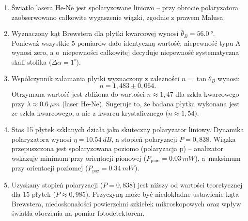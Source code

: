\documentclass[a4paper,12pt]{article}
\begin{document}
\begin{enumerate}
  \item Światło lasera He-Ne jest spolaryzowane liniowo -- przy obrocie polaryzatora
  zaobserwowano całkowite wygaszenie wiązki, zgodnie z prawem Malusa.

  \item Wyznaczony kąt Brewstera dla płytki kwarcowej wynosi $\bar{\theta}_B = \SI{56,0}{\degree}$.
  Ponieważ wszystkie 5 pomiarów dało identyczną wartość, niepewność typu A wynosi zero,
  a o~niepewności całkowitej decyduje niepewność systematyczna skali stolika ($\Delta\alpha = 1^\circ$).

  \item Współczynnik załamania płytki wyznaczony z zależności $n = \tan\theta_B$ wynosi:
  \[
  n = 1{,}483 \pm 0{,}064 .
  \]
  Otrzymana wartość jest zbliżona do wartości $n \approx 1{,}47$ dla szkła kwarcowego
  przy $\lambda \approx \SI{0,6}{\mu m}$ (laser He-Ne). Sugeruje to, że badana płytka
  wykonana jest ze szkła kwarcowego, a nie z kwarcu krystalicznego ($n \approx 1{,}54$).

  \item Stos 15 płytek szklanych działa jako skuteczny polaryzator liniowy. Dynamika
  polaryzatora wynosi $\eta = \SI{10,54}{dB}$, a stopień polaryzacji $P = 0{,}838$.
  Wiązka przepuszczona jest spolaryzowana poziomo (polaryzacja p) -- analizator
  wskazuje minimum przy orientacji pionowej ($P_{\text{pion}} = \SI{0,03}{mW}$),
  a~maksimum przy orientacji poziomej ($P_{\text{poz}} = \SI{0,34}{mW}$).

  \item Uzyskany stopień polaryzacji ($P = 0{,}838$) jest niższy od wartości teoretycznej
  dla 15 płytek ($P \approx 0{,}985$). Przyczyną może być niedokładne ustawienie kąta
  Brewstera, niedoskonałości powierzchni szkiełek mikroskopowych oraz wpływ światła
  otoczenia na pomiar fotodetektorem.
\end{enumerate}
\end{document}
